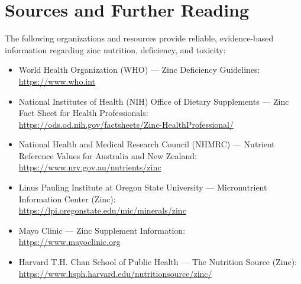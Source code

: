 \section*{Sources and Further Reading}
The following organizations and resources provide reliable, evidence-based information regarding zinc nutrition, deficiency, and toxicity:

\begin{itemize}
    \item World Health Organization (WHO) --- Zinc Deficiency Guidelines:\\
    \url{https://www.who.int}
    \item National Institutes of Health (NIH) Office of Dietary Supplements --- Zinc Fact Sheet for Health Professionals:\\
    \url{https://ods.od.nih.gov/factsheets/Zinc-HealthProfessional/}
    \item National Health and Medical Research Council (NHMRC) --- Nutrient Reference Values for Australia and New Zealand:\\
    \url{https://www.nrv.gov.au/nutrients/zinc}
    \item Linus Pauling Institute at Oregon State University --- Micronutrient Information Center (Zinc):\\
    \url{https://lpi.oregonstate.edu/mic/minerals/zinc}
    \item Mayo Clinic --- Zinc Supplement Information:\\
    \url{https://www.mayoclinic.org}
    \item Harvard T.H. Chan School of Public Health --- The Nutrition Source (Zinc):\\
    \url{https://www.hsph.harvard.edu/nutritionsource/zinc/}
\end{itemize}